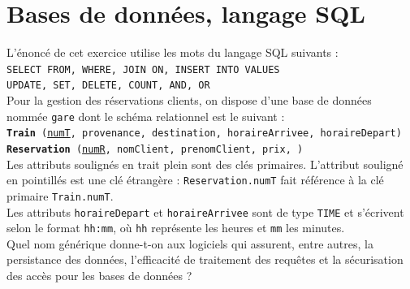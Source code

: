 \documentclass[a4paper,12pt,eval,firamath]{nsi}
\begin{document}
\maketitle


\section{Bases de données, langage SQL}

L'énoncé de cet exercice utilise les mots du langage SQL suivants :\\

\texttt{SELECT FROM, WHERE, JOIN ON, INSERT INTO VALUES}\\
\texttt{UPDATE, SET, DELETE, COUNT, AND, OR}\\

Pour la gestion des réservations clients, on dispose d'une base de données nommée \texttt{gare} dont le schéma relationnel est le suivant :\\

\texttt{\textbf{Train} (\uline{numT}, provenance, destination, horaireArrivee, horaireDepart)}\\

\texttt{\textbf{Reservation} (\uline{numR}, nomClient, prenomClient, prix, )}\\

Les attributs soulignés en trait plein sont des clés primaires. L'attribut souligné en pointillés est une clé étrangère : \texttt{Reservation.numT} fait référence à la clé primaire \texttt{Train.numT}.\\

Les attributs \texttt{horaireDepart} et \texttt{horaireArrivee} sont de type  \texttt{TIME} et s'écrivent selon le format \texttt{hh:mm}, où \texttt{hh} représente les heures et \texttt{mm} les minutes.\\


\question Quel nom générique donne-t-on aux logiciels qui assurent, entre autres, la persistance des données, l'efficacité de traitement des requêtes et la sécurisation des accès pour les bases de données ?\\
            
            \\
            
\end{document}
